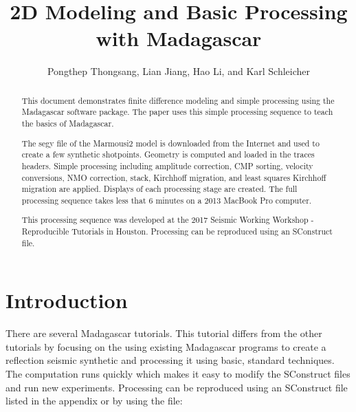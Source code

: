 
\title{2D Modeling and Basic Processing with Madagascar}   
\author{Pongthep Thongsang, Lian Jiang, Hao Li, and Karl Schleicher}


\address{
k\_schleicher@hotmail.com \\
John A. and Katherine G. Jackson School of Geosciences \\
The University of Texas at Austin \\
University Station, Box X \\
Austin, TX 78713-8924}

\maketitle

\begin{abstract}
This document demonstrates finite difference modeling and simple processing
using the Madagascar software package.  The paper uses this simple processing 
sequence to teach the basics of Madagascar. 

The segy file of the Marmousi2 model is downloaded from the Internet and used
to create a few synthetic shotpoints.  Geometry is computed and loaded in the
traces headers.   Simple processing including amplitude correction, CMP
sorting, velocity conversions, NMO correction, stack, Kirchhoff migration, and
least squares Kirchhoff migration are applied.  Displays of each processing
stage are created.  The full processing sequence takes less that 6 minutes on
a 2013 MacBook Pro computer. 

This processing sequence was developed at the 2017 Seismic Working Workshop - 
Reproducible Tutorials in Houston.  Processing can be reproduced using an 
SConstruct file.

\end{abstract}

\section{Introduction}
There are several Madagascar tutorials.  This tutorial differs from the other 
tutorials by focusing on the using existing Madagascar programs to create 
a reflection seismic synthetic and processing it using basic, standard 
techniques.  The computation runs quickly which makes it easy to 
modify the SConstruct files and run new experiments.  Processing can be 
reproduced using an SConstruct file listed in the appendix or by using the file:

